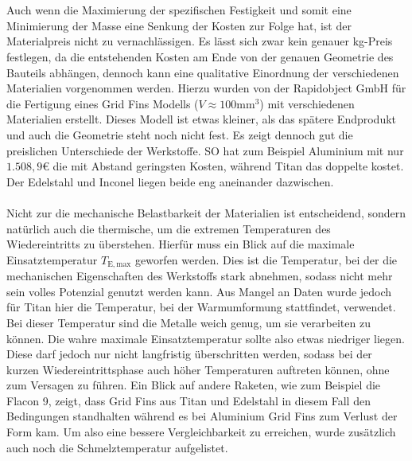 \\~\\
Auch wenn die Maximierung der spezifischen Festigkeit und somit eine Minimierung der Masse eine Senkung der Kosten zur Folge hat, ist der Materialpreis nicht zu vernachlässigen. Es lässt sich zwar kein genauer kg-Preis festlegen, da die entstehenden Kosten am Ende von der genauen Geometrie des Bauteils abhängen, dennoch kann eine qualitative Einordnung der verschiedenen Materialien vorgenommen werden. Hierzu wurden von der Rapidobject GmbH für die Fertigung eines Grid Fins Modells ($V \approx 100\mathrm{mm}^3$) mit verschiedenen Materialien erstellt. Dieses Modell ist etwas kleiner, als das spätere Endprodukt und auch die Geometrie steht noch nicht fest. Es zeigt dennoch gut die preislichen Unterschiede der Werkstoffe.
SO hat zum Beispiel Aluminium mit nur $1.508,9$€ die mit Abstand geringsten Kosten, während Titan das doppelte kostet. Der Edelstahl und Inconel liegen beide eng aneinander dazwischen.
\\~\\
Nicht zur die mechanische Belastbarkeit der Materialien ist entscheidend, sondern natürlich auch die thermische, um die extremen Temperaturen des Wiedereintritts zu überstehen. Hierfür muss ein Blick auf die maximale Einsatztemperatur $T_\mathrm{E, max}$ geworfen werden. Dies ist die Temperatur, bei der die mechanischen Eigenschaften des Werkstoffs stark abnehmen, sodass nicht mehr sein volles Potenzial genutzt werden kann. Aus Mangel an Daten wurde jedoch für Titan hier die Temperatur, bei der Warmumformung stattfindet, verwendet. Bei dieser Temperatur sind die Metalle weich genug, um sie verarbeiten zu können. Die wahre maximale Einsatztemperatur sollte also etwas niedriger liegen. Diese darf jedoch nur nicht langfristig überschritten werden, sodass bei der kurzen Wiedereintrittsphase auch höher Temperaturen auftreten können, ohne zum Versagen zu führen. Ein Blick auf andere Raketen, wie zum Beispiel die Flacon 9, zeigt, dass Grid Fins aus Titan und Edelstahl in diesem Fall den Bedingungen standhalten während es bei Aluminium Grid Fins zum Verlust der Form kam. Um also eine bessere Vergleichbarkeit zu erreichen, wurde zusätzlich auch noch die Schmelztemperatur aufgelistet.
